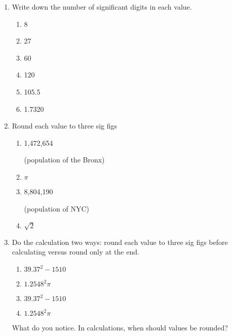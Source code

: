 \begin{enumerate}
\item Write down the number of significant digits in each value.
  \begin{multicols}{3}
    \begin{enumerate}[itemsep=1cm]
      \item 8
      \item 27
      \item 60
      \item 120
      \item 105.5
      \item 1.7320
    \end{enumerate}
  \end{multicols} \vspace{1cm}

\item Round each value to three sig figs
  \begin{multicols}{2}
    \begin{enumerate}[itemsep=0.5cm]
      \item 1,472,654 \par (population of the Bronx)
      \item $\pi$
      \item 8,804,190 \par (population of NYC)
      \item $\sqrt{2}$
    \end{enumerate}
  \end{multicols} \vspace{1cm}

\item Do the calculation two ways: round each value to three sig figs before calculating versus round only at the end.
  \begin{multicols}{2}
    \begin{enumerate}[itemsep=3cm]
      \item $39.37^2-1510$
      \item $1.2548^2 \pi$
      \item $39.37^2-1510$
      \item $1.2548^2 \pi$
    \end{enumerate}
  \end{multicols} \vspace{1cm}
  What do you notice. In calculations, when should values be rounded?


\end{enumerate}

